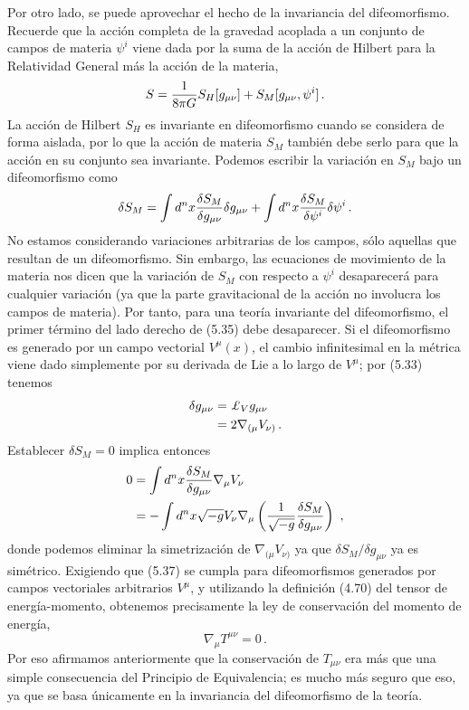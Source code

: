 \documentclass[11pt,b5paper,openany,twoside]{book}
\newcommand{\mn}{{\mu\nu}}
\def\g{{\sqrt{-g}}}
\def\lie{\pounds}
\begin{document}
Por otro lado, se puede aprovechar el hecho de la invariancia del difeomorfismo.
Recuerde que la acción completa de la gravedad acoplada a un conjunto de campos de materia $\psi^i$ viene dada por la suma de la acción de Hilbert para la Relatividad General más la acción de la materia,
\begin{equation}
S={1\over{8\pi G}}S_H[g_\mn]+S_M[g_\mn,\psi^i]\,.\label{5.34}
\end{equation}
La acción de Hilbert $S_H$ es invariante en difeomorfismo cuando se considera de forma aislada, por lo que la acción de materia $S_M$ también debe serlo para que la acción en su conjunto sea invariante.
Podemos escribir la variación en $S_M$ bajo un difeomorfismo como
\begin{equation}
\delta S_M=\int d^nx {{\delta S_M}\over{\delta g_\mn}}\delta g_\mn
+ \int d^nx {{\delta S_M}\over{\delta \psi^i}}\delta \psi^i\,.
\label{5.35}
\end{equation}
No estamos considerando variaciones arbitrarias de los campos, sólo aquellas que resultan de un difeomorfismo.
Sin embargo, las ecuaciones de movimiento de la materia nos dicen que la variación de $S_M$ con respecto a $\psi^i$ desaparecerá para cualquier variación (ya que la parte gravitacional de la acción no involucra los campos de materia).
Por tanto, para una teoría invariante del difeomorfismo, el primer término del lado derecho de (5.35) debe desaparecer.
Si el difeomorfismo es generado por un campo vectorial $V^\mu(x)$, el cambio infinitesimal en la métrica viene dado simplemente por su derivada de Lie a lo largo de $V^\mu$; por (5.33) tenemos
\begin{align}
\delta g_\mn  &=  \lie_V g_\mn \notag \\
&=  2\nabla_{(\mu} V_{\nu)}\,.\label{5.36}
\end{align}
Establecer $\delta S_M=0$ implica entonces
\begin{align}
0  &=  \int d^nx {{\delta S_M}\over{\delta g_\mn}}
\nabla_{\mu} V_{\nu}  \notag \\
&=  -\int d^nx\g V_\nu\nabla_\mu\left({1\over{\g}}{{\delta S_M}\over
{\delta g_\mn}}\right)\ ,\label{5.37}
\end{align}
donde podemos eliminar la simetrización de $\nabla_{(\mu} V_{\nu)}$ ya que $\delta S_M/\delta g_\mn$ ya es simétrico.
Exigiendo que (5.37) se cumpla para difeomorfismos generados por campos vectoriales arbitrarios $V^\mu$, y utilizando la definición (4.70) del tensor de energía-momento, obtenemos precisamente la ley de conservación del momento de energía,
\begin{equation}
\nabla_\mu T^\mn=0\,.\label{5.38}
\end{equation}
Por eso afirmamos anteriormente que la conservación de $T_\mn$ era más que una simple consecuencia del Principio de Equivalencia; es mucho más seguro que eso, ya que se basa únicamente en la invariancia del difeomorfismo de la teoría.
\end{document}
